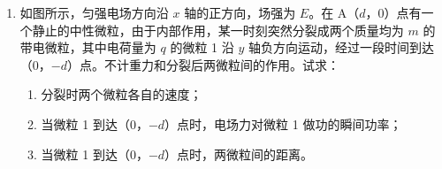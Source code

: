 \documentclass[\gkver]{gaokaozhenti}
\begin{document}
\begin{enumerate}
{

解法二：设运动员和吊椅的质量分别为 $M$ 和 $m$；运动员竖直向下的拉力为 $F$，对吊椅的压力大小为 $F_{N}$。根据牛顿第三定律，绳对运动员的拉力大小为 $F$，吊椅对运动员的支持力为 $F_{N}$。分别以运动员和吊椅为研究对象，根据牛顿第二定律

$F+F_{N}-Mg=Ma$ ①

$F-F_{N}-mg=ma$ ②

由①②得 $F=440\UN$，$F_{N}=275\UN$。
}

\item
如图所示，匀强电场方向沿 $x$ 轴的正方向，场强为 $E$。在 A（$d$，0）点有一个静止的中性微粒，由于内部作用，某一时刻突然分裂成两个质量均为 $m$ 的带电微粒，其中电荷量为 $q$ 的微粒 1 沿 $y$ 轴负方向运动，经过一段时间到达（0，$-d$）点。不计重力和分裂后两微粒间的作用。试求：

\begin{enumerate}
	\item
	分裂时两个微粒各自的速度；
	\item
	当微粒 1 到达（0，$-d$）点时，电场力对微粒 1 做功的瞬间功率；
	\item
	当微粒 1 到达（0，$-d$）点时，两微粒间的距离。
\end{enumerate}


\end{enumerate}
\end{document}
